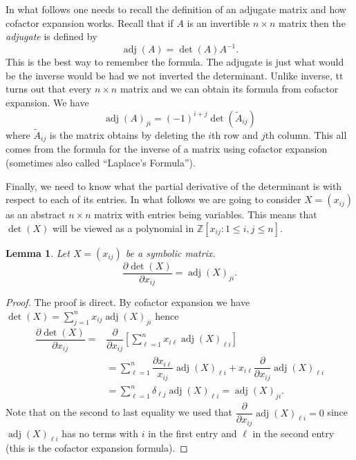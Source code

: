 \documentclass[12pt]{book}
\numberwithin{equation}{section}
\newtheorem{lemma}[theorem]{Lemma}
\theoremstyle{definition}
\theoremstyle{remark}
\newcommand{\ZZ}{\mathbb{Z}}
\newcommand{\adj}{\operatorname{adj}}
\begin{document}
In what follows one needs to recall the definition of an adjugate matrix and how cofactor expansion works. 
Recall that if $A$ is an invertible $n\times n$ matrix then the \emph{adjugate} is defined by 
$$\adj(A) = \det(A) A^{-1}.$$
This is the best way to remember the formula.  
The adjugate is just what would be the inverse would be had we not inverted the determinant. 
Unlike inverse, tt turns out that every $n\times n$ matrix and we can obtain its formula from cofactor expansion. 
We have 
 $$ \adj(A)_{ji} = (-1)^{i+j} \det(\widetilde{A}_{ij})$$
where $\widetilde{A}_{ij}$ is the matrix obtains by deleting the $i$th row and $j$th column.
This all comes from the formula for the inverse of a matrix using cofactor expansion (sometimes also called ``Laplace's Formula'').

Finally, we need to know what the partial derivative of the determinant is with respect to each of its entries. 
In what follows we are going to consider $X = (x_{ij})$ as an abstract $n\times n$  matrix with entries being variables. 
This means that $\det(X)$ will be viewed as a polynomial in $\ZZ[x_{ij}\colon 1 \leq i,j \leq n ]$. 
\begin{lemma}
	Let $X =(x_{ij})$ be a symbolic matrix. 
	$$ \dfrac{\partial \det(X)}{\partial x_{ij}} = \adj(X)_{ji}. $$
\end{lemma}
\begin{proof}
	The proof is direct. 
	By cofactor expansion we have $\det(X) = \sum_{j=1}^n x_{ij} \adj(X)_{ji}$ hence
	 \begin{align*}
	 	\dfrac{\partial \det(X)}{\partial x_{ij}} = & \dfrac{\partial}{\partial x_{ij}} \left [ \sum_{\ell=1}^n x_{i\ell} \adj(X)_{\ell i}\right] \\
	 	&= \sum_{\ell=1}^n \dfrac{\partial x_{i\ell}}{x_{ij}} \adj(X)_{\ell i} + x_{i\ell} \dfrac{\partial }{\partial x_{ij}} \adj(X)_{\ell i} \\
	 	&= \sum_{\ell=1}^n \delta_{\ell j} \adj(X)_{\ell i} = \adj(X)_{ji}.
	 \end{align*}
 	Note that on the second to last equality we used that $\dfrac{\partial }{\partial x_{ij}} \adj(X)_{\ell i}=0$ since $\adj(X)_{\ell i}$ has no terms with $i$ in the first entry and $\ell$ in the second entry (this is the cofactor expansion formula).
\end{proof}
\end{document}
